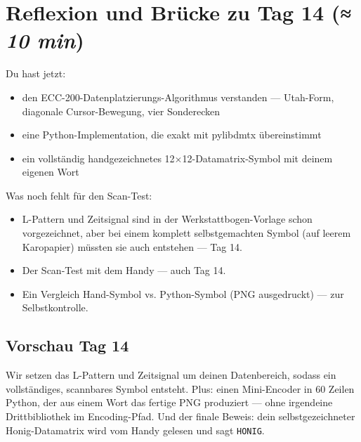 \section{Reflexion und Brücke zu Tag 14 \normalfont(\textit{≈ 10 min})}

Du hast jetzt:

\begin{itemize}
\item den ECC-200-Datenplatzierungs-Algorithmus verstanden — Utah-Form,
  diagonale Cursor-Bewegung, vier Sonderecken
\item eine Python-Implementation, die exakt mit pylibdmtx übereinstimmt
\item ein vollständig handgezeichnetes 12$\times$12-Datamatrix-Symbol mit
  deinem eigenen Wort
\end{itemize}

Was noch fehlt für den Scan-Test:

\begin{itemize}
\item L-Pattern und Zeitsignal sind in der Werkstattbogen-Vorlage
  schon vorgezeichnet, aber bei einem komplett selbstgemachten Symbol
  (auf leerem Karopapier) müssten sie auch entstehen — Tag 14.
\item Der Scan-Test mit dem Handy — auch Tag 14.
\item Ein Vergleich Hand-Symbol vs. Python-Symbol (PNG ausgedruckt) —
  zur Selbstkontrolle.
\end{itemize}

\subsection*{Vorschau Tag 14}

Wir setzen das L-Pattern und Zeitsignal um deinen Datenbereich, sodass
ein vollständiges, scannbares Symbol entsteht. Plus: einen Mini-Encoder
in 60 Zeilen Python, der aus einem Wort das fertige PNG produziert —
ohne irgendeine Drittbibliothek im Encoding-Pfad. Und der finale
Beweis: dein selbstgezeichneter Honig-Datamatrix wird vom Handy
gelesen und sagt \texttt{HONIG}.
